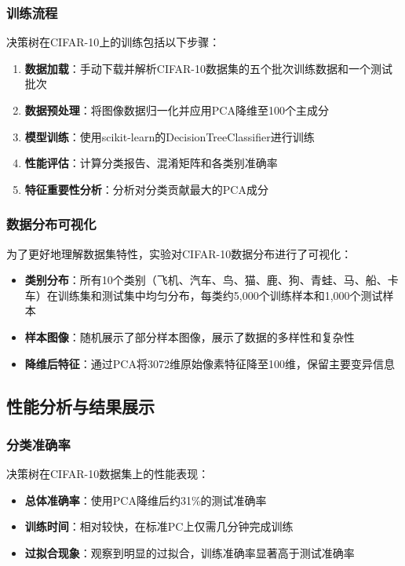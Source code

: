 \documentclass[UTF8]{report}
\theoremstyle{MyLineTheoremStyle} %
\theoremstyle{MyBlockTheoremStyle} %
\theoremstyle{MySubsubsectionStyle} %
\begin{document}
\subsubsection{训练流程}
决策树在CIFAR-10上的训练包括以下步骤：

\begin{enumerate}[label=\arabic*.]
    \item \textbf{数据加载}：手动下载并解析CIFAR-10数据集的五个批次训练数据和一个测试批次
    \item \textbf{数据预处理}：将图像数据归一化并应用PCA降维至100个主成分
    \item \textbf{模型训练}：使用scikit-learn的DecisionTreeClassifier进行训练
    \item \textbf{性能评估}：计算分类报告、混淆矩阵和各类别准确率
    \item \textbf{特征重要性分析}：分析对分类贡献最大的PCA成分
\end{enumerate}

\subsubsection{数据分布可视化}
为了更好地理解数据集特性，实验对CIFAR-10数据分布进行了可视化：

\begin{itemize}
    \item \textbf{类别分布}：所有10个类别（飞机、汽车、鸟、猫、鹿、狗、青蛙、马、船、卡车）在训练集和测试集中均匀分布，每类约5,000个训练样本和1,000个测试样本
    \item \textbf{样本图像}：随机展示了部分样本图像，展示了数据的多样性和复杂性
    \item \textbf{降维后特征}：通过PCA将3072维原始像素特征降至100维，保留主要变异信息
\end{itemize}

\subsection{性能分析与结果展示}

\subsubsection{分类准确率}
决策树在CIFAR-10数据集上的性能表现：

\begin{itemize}
    \item \textbf{总体准确率}：使用PCA降维后约31\%的测试准确率
    \item \textbf{训练时间}：相对较快，在标准PC上仅需几分钟完成训练
    \item \textbf{过拟合现象}：观察到明显的过拟合，训练准确率显著高于测试准确率
\end{itemize}
\end{document}
